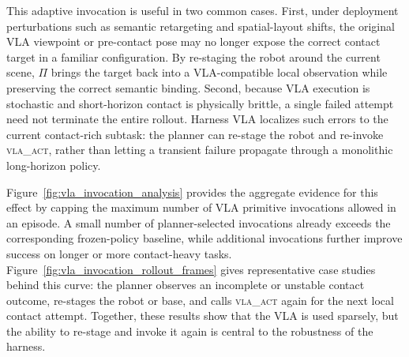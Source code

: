 \documentclass{article}
\begin{document}
This adaptive invocation is useful in two common cases. First, under deployment perturbations such as semantic retargeting and spatial-layout shifts, the original VLA viewpoint or pre-contact pose may no longer expose the correct contact target in a familiar configuration. By re-staging the robot around the current scene, $\Pi$ brings the target back into a VLA-compatible local observation while preserving the correct semantic binding. Second, because VLA execution is stochastic and short-horizon contact is physically brittle, a single failed attempt need not terminate the entire rollout. Harness VLA localizes such errors to the current contact-rich subtask: the planner can re-stage the robot and re-invoke \textsc{vla\_act}, rather than letting a transient failure propagate through a monolithic long-horizon policy.

Figure~\ref{fig:vla_invocation_analysis} provides the aggregate evidence for this effect by capping the maximum number of VLA primitive invocations allowed in an episode. A small number of planner-selected invocations already exceeds the corresponding frozen-policy baseline, while additional invocations further improve success on longer or more contact-heavy tasks. Figure~\ref{fig:vla_invocation_rollout_frames} gives representative case studies behind this curve: the planner observes an incomplete or unstable contact outcome, re-stages the robot or base, and calls \textsc{vla\_act} again for the next local contact attempt. Together, these results show that the VLA is used sparsely, but the ability to re-stage and invoke it again is central to the robustness of the harness.
\end{document}
